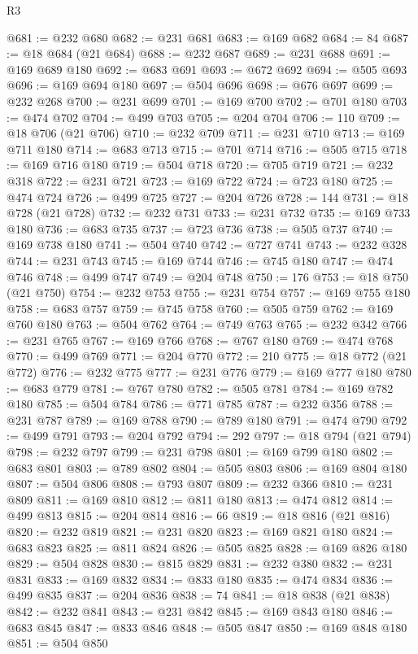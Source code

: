 \begin{lexlean}{R3}
\begin{coremodule}
@681 := @232 @680
@682 := @231 @681
@683 := @169 @682
@684 := 84
@687 := @18 @684 (@21 @684)
@688 := @232 @687
@689 := @231 @688
@691 := @169 @689 @180
@692 := @683 @691
@693 := @672 @692
@694 := @505 @693
@696 := @169 @694 @180
@697 := @504 @696
@698 := @676 @697
@699 := @232 @268
@700 := @231 @699
@701 := @169 @700
@702 := @701 @180
@703 := @474 @702
@704 := @499 @703
@705 := @204 @704
@706 := 110
@709 := @18 @706 (@21 @706)
@710 := @232 @709
@711 := @231 @710
@713 := @169 @711 @180
@714 := @683 @713
@715 := @701 @714
@716 := @505 @715
@718 := @169 @716 @180
@719 := @504 @718
@720 := @705 @719
@721 := @232 @318
@722 := @231 @721
@723 := @169 @722
@724 := @723 @180
@725 := @474 @724
@726 := @499 @725
@727 := @204 @726
@728 := 144
@731 := @18 @728 (@21 @728)
@732 := @232 @731
@733 := @231 @732
@735 := @169 @733 @180
@736 := @683 @735
@737 := @723 @736
@738 := @505 @737
@740 := @169 @738 @180
@741 := @504 @740
@742 := @727 @741
@743 := @232 @328
@744 := @231 @743
@745 := @169 @744
@746 := @745 @180
@747 := @474 @746
@748 := @499 @747
@749 := @204 @748
@750 := 176
@753 := @18 @750 (@21 @750)
@754 := @232 @753
@755 := @231 @754
@757 := @169 @755 @180
@758 := @683 @757
@759 := @745 @758
@760 := @505 @759
@762 := @169 @760 @180
@763 := @504 @762
@764 := @749 @763
@765 := @232 @342
@766 := @231 @765
@767 := @169 @766
@768 := @767 @180
@769 := @474 @768
@770 := @499 @769
@771 := @204 @770
@772 := 210
@775 := @18 @772 (@21 @772)
@776 := @232 @775
@777 := @231 @776
@779 := @169 @777 @180
@780 := @683 @779
@781 := @767 @780
@782 := @505 @781
@784 := @169 @782 @180
@785 := @504 @784
@786 := @771 @785
@787 := @232 @356
@788 := @231 @787
@789 := @169 @788
@790 := @789 @180
@791 := @474 @790
@792 := @499 @791
@793 := @204 @792
@794 := 292
@797 := @18 @794 (@21 @794)
@798 := @232 @797
@799 := @231 @798
@801 := @169 @799 @180
@802 := @683 @801
@803 := @789 @802
@804 := @505 @803
@806 := @169 @804 @180
@807 := @504 @806
@808 := @793 @807
@809 := @232 @366
@810 := @231 @809
@811 := @169 @810
@812 := @811 @180
@813 := @474 @812
@814 := @499 @813
@815 := @204 @814
@816 := 66
@819 := @18 @816 (@21 @816)
@820 := @232 @819
@821 := @231 @820
@823 := @169 @821 @180
@824 := @683 @823
@825 := @811 @824
@826 := @505 @825
@828 := @169 @826 @180
@829 := @504 @828
@830 := @815 @829
@831 := @232 @380
@832 := @231 @831
@833 := @169 @832
@834 := @833 @180
@835 := @474 @834
@836 := @499 @835
@837 := @204 @836
@838 := 74
@841 := @18 @838 (@21 @838)
@842 := @232 @841
@843 := @231 @842
@845 := @169 @843 @180
@846 := @683 @845
@847 := @833 @846
@848 := @505 @847
@850 := @169 @848 @180
@851 := @504 @850

\end{coremodule}
\end{lexlean}
